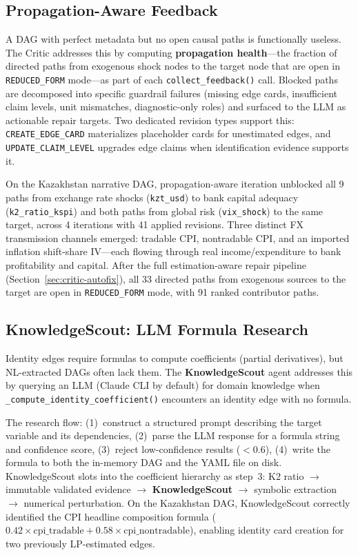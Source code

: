 \documentclass{article}
\begin{document}
\subsection{Propagation-Aware Feedback}
\label{sec:critic-propagation}

A DAG with perfect metadata but no open causal paths is functionally useless. The Critic addresses this by computing \textbf{propagation health}---the fraction of directed paths from exogenous shock nodes to the target node that are open in \texttt{REDUCED\_FORM} mode---as part of each \texttt{collect\_feedback()} call. Blocked paths are decomposed into specific guardrail failures (missing edge cards, insufficient claim levels, unit mismatches, diagnostic-only roles) and surfaced to the LLM as actionable repair targets. Two dedicated revision types support this: \texttt{CREATE\_EDGE\_CARD} materializes placeholder cards for unestimated edges, and \texttt{UPDATE\_CLAIM\_LEVEL} upgrades edge claims when identification evidence supports it.

On the Kazakhstan narrative DAG, propagation-aware iteration unblocked all 9 paths from exchange rate shocks (\texttt{kzt\_usd}) to bank capital adequacy (\texttt{k2\_ratio\_kspi}) and both paths from global risk (\texttt{vix\_shock}) to the same target, across 4 iterations with 41 applied revisions. Three distinct FX transmission channels emerged: tradable CPI, nontradable CPI, and an imported inflation shift-share IV---each flowing through real income/expenditure to bank profitability and capital. After the full estimation-aware repair pipeline (Section~\ref{sec:critic-autofix}), all 33 directed paths from exogenous sources to the target are open in \texttt{REDUCED\_FORM} mode, with 91 ranked contributor paths.

\subsection{KnowledgeScout: LLM Formula Research}
\label{sec:knowledge-scout}

Identity edges require formulas to compute coefficients (partial derivatives), but NL-extracted DAGs often lack them. The \textbf{KnowledgeScout} agent addresses this by querying an LLM (Claude CLI by default) for domain knowledge when \texttt{\_compute\_identity\_coefficient()} encounters an identity edge with no formula.

The research flow: (1)~construct a structured prompt describing the target variable and its dependencies, (2)~parse the LLM response for a formula string and confidence score, (3)~reject low-confidence results ($<0.6$), (4)~write the formula to both the in-memory DAG and the YAML file on disk. KnowledgeScout slots into the coefficient hierarchy as step~3: K2 ratio $\to$ immutable validated evidence $\to$ \textbf{KnowledgeScout} $\to$ symbolic extraction $\to$ numerical perturbation. On the Kazakhstan DAG, KnowledgeScout correctly identified the CPI headline composition formula ($0.42 \times \text{cpi\_tradable} + 0.58 \times \text{cpi\_nontradable}$), enabling identity card creation for two previously LP-estimated edges.
\end{document}
